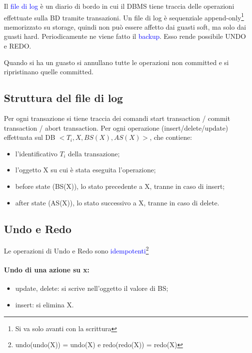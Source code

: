 Il \textcolor{blue}{file di log} è un diario di bordo in cui il DBMS tiene traccia delle operazioni effettuate sulla BD tramite transazioni. Un file di log è sequenziale append-only\footnote{Si va solo avanti con la scrittura} memorizzato su storage, quindi non può essere affetto dai guasti soft, ma solo dai guasti hard. Periodicamente ne viene fatto il \textcolor{blue}{backup}. Esso rende possibile UNDO e REDO.

Quando si ha un guasto si annullano tutte le operazioni non committed e si ripristinano quelle committed.

\subsection{Struttura del file di log}

Per ogni transazione si tiene traccia dei comandi start transaction / commit transaction / abort transaction. Per ogni operazione (insert/delete/update) effettuata sul DB $<T_i, X, BS(X), AS(X)>$, che contiene:

\begin{itemize}
    \item l'identificativo $T_i$ della transazione;
    \item l'oggetto X su cui è stata eseguita l'operazione;
    \item before state (BS(X)), lo stato precedente a X, tranne in caso di insert;
    \item after state (AS(X)), lo stato successivo a X, tranne in caso di delete.
\end{itemize}

\subsection{Undo e Redo}

Le operazioni di Undo e Redo sono \textcolor{blue}{idempotenti}\footnote{undo(undo(X)) = undo(X) e redo(redo(X)) = redo(X)}
\paragraph{Undo di una azione su x:}

\begin{itemize}
    \item update, delete: si scrive nell'oggetto il valore di BS;
    \item insert: si elimina X.
\end{itemize}

